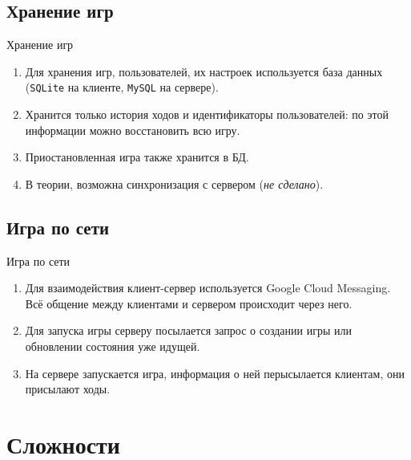 \documentclass{beamer}
\def\t{\texttt}
\begin{document}
\subsection{Хранение игр}
\begin{frame}[t]{Хранение игр}
	\begin{enumerate}
		\item Для хранения игр, пользователей, их настроек используется база данных (\t{SQLite} на клиенте, \t{MySQL} на сервере).
		\item Хранится только история ходов и идентификаторы пользователей: по этой информации можно восстановить всю игру.
		\item Приостановленная игра также хранится в БД.
		\item В теории, возможна синхронизация с сервером (\textit{не сделано}).
	\end{enumerate}
\end{frame}

\subsection{Игра по сети}
\begin{frame}[t]{Игра по сети}
	\begin{enumerate}
		\item
			Для взаимодействия клиент-сервер используется Google Cloud Messaging.
			Всё общение между клиентами и сервером происходит через него.

		\item
			Для запуска игры серверу посылается запрос о создании игры или обновлении состояния уже идущей.

		\item
			На сервере запускается игра, информация о ней перысылается клиентам, они присылают ходы.
	\end{enumerate}
\end{frame}

\section{Сложности}
\end{document}
